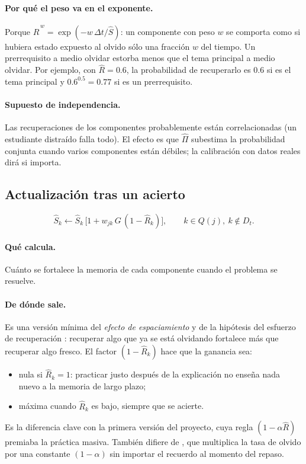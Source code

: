 \documentclass[11pt]{article}
\theoremstyle{definition}
\theoremstyle{remark}
\newcommand{\Rh}{\hat R}
\newcommand{\Sh}{\hat S}
\newcommand{\Pih}{\hat\Pi}
\begin{document}
\paragraph{Por qué el peso va en el exponente.} Porque $\Rh^{\,w}=\exp(-w\,\Delta t/\Sh)$: un componente con peso $w$ se comporta como si hubiera estado expuesto al olvido sólo una fracción $w$ del tiempo. Un prerrequisito a medio olvidar estorba menos que el tema principal a medio olvidar. Por ejemplo, con $\Rh=0.6$, la probabilidad de recuperarlo es $0.6$ si es el tema principal y $0.6^{0.5}=0.77$ si es un prerrequisito.

\paragraph{Supuesto de independencia.} Las recuperaciones de los componentes probablemente están correlacionadas (un estudiante distraído falla todo). El efecto es que $\Pih$ subestima la probabilidad conjunta cuando varios componentes están débiles; la calibración con datos reales dirá si importa.

\subsection{Actualización tras un acierto}
\label{sec:actualizacion}

\begin{equation}
\Sh_k\leftarrow\Sh_k\,\bigl[1+w_{jk}\,G\,(1-\Rh_k)\bigr],\qquad k\in Q(j),\ k\notin D_t.
\label{eq:acierto}
\end{equation}

\paragraph{Qué calcula.} Cuánto se fortalece la memoria de cada componente cuando el problema se resuelve.

\paragraph{De dónde sale.} Es una versión mínima del \emph{efecto de espaciamiento} y de la hipótesis del esfuerzo de recuperación \citep{pyc2009}: recuperar algo que ya se está olvidando fortalece más que recuperar algo fresco. El factor $(1-\Rh_k)$ hace que la ganancia sea:
\begin{itemize}
\item nula si $\Rh_k=1$: practicar justo después de la explicación no enseña nada nuevo a la memoria de largo plazo;
\item máxima cuando $\Rh_k$ es bajo, siempre que se acierte.
\end{itemize}
Es la diferencia clave con la primera versión del proyecto, cuya regla $(1-\alpha\Rh)$ premiaba la práctica masiva. También difiere de \citet{tabibian2019}, que multiplica la tasa de olvido por una constante $(1-\alpha)$ sin importar el recuerdo al momento del repaso.
\end{document}
